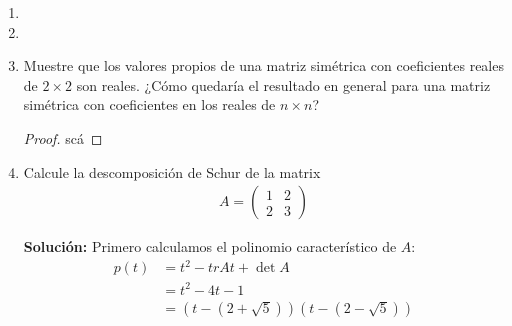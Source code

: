 \documentclass{article}
\theoremstyle{definition}
\begin{document}
\begin{enumerate}
\item 
\item 

\item Muestre que los valores propios de una matriz simétrica con coeficientes reales de $ 2 \times 2$ son reales. ¿Cómo quedaría el resultado en general para una matriz simétrica con coeficientes en los reales de $n \times n$?

\begin{proof}
	scá
	
\end{proof}

\item Calcule la descomposición de Schur de la matrix
	\begin{align}
		A = \begin{pmatrix}
			1 & 2 \\
			2 & 3
		\end{pmatrix}
	\end{align}

\textbf{Solución:} Primero calculamos el polinomio característico de $A$:
	\begin{align}
		p(t) & = t^2-tr A t+\det A \\
		&  = t^2 -4t-1 \\
		& = \left (t- \left(2+\sqrt{5} \right) \right) \left( t-\left(2-\sqrt{5}\right) \right)
	\end{align}
	

\end{enumerate}
\end{document}

